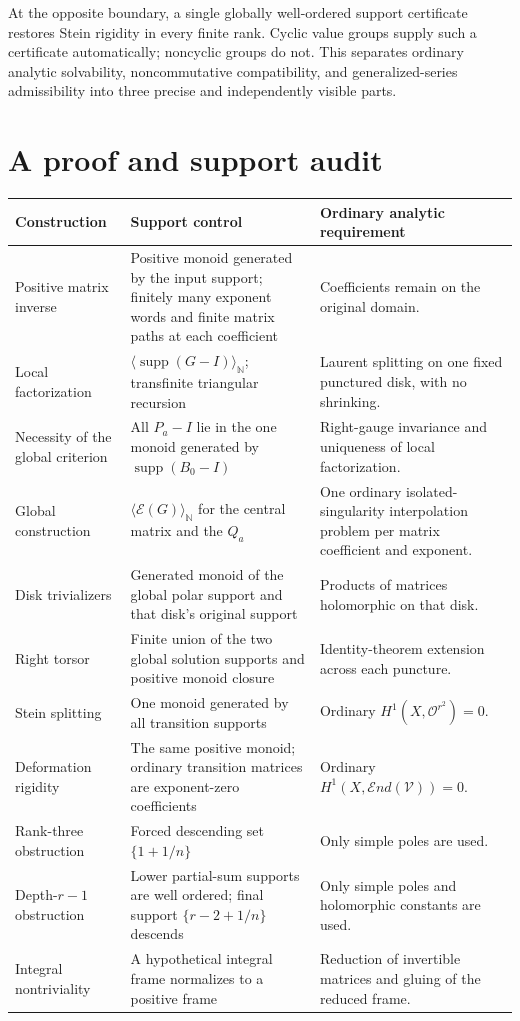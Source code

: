 \documentclass[11pt,letterpaper]{article}
\theoremstyle{definition}
\theoremstyle{remark}
\newcommand{\N}{\mathbb N}
\newcommand{\OO}{\mathcal O}
\newcommand{\supp}{\operatorname{supp}}
\newcommand{\End}{\mathcal E nd}
\newcommand{\EU}{\mathcal E}
\newcommand{\angles}[1]{\langle #1\rangle_{\N}}
\numberwithin{equation}{section}
\begin{document}
At the opposite boundary, a single globally well-ordered support certificate restores Stein rigidity in every finite rank. Cyclic value groups supply such a certificate automatically; noncyclic groups do not. This separates ordinary analytic solvability, noncommutative compatibility, and generalized-series admissibility into three precise and independently visible parts.

\appendix

\section{A proof and support audit}\label{app:audit}

\begin{longtable}{@{}L{0.25\textwidth}L{0.35\textwidth}L{0.32\textwidth}@{}}
\toprule
Construction & Support control & Ordinary analytic requirement\\
\midrule
\endhead
Positive matrix inverse & Positive monoid generated by the input support; finitely many exponent words and finite matrix paths at each coefficient & Coefficients remain on the original domain.\\[0.4em]
Local factorization & $\angles{\supp(G-I)}$; transfinite triangular recursion & Laurent splitting on one fixed punctured disk, with no shrinking.\\[0.4em]
Necessity of the global criterion & All $P_a-I$ lie in the one monoid generated by $\supp(B_0-I)$ & Right-gauge invariance and uniqueness of local factorization.\\[0.4em]
Global construction & $\angles{\EU(G)}$ for the central matrix and the $Q_a$ & One ordinary isolated-singularity interpolation problem per matrix coefficient and exponent.\\[0.4em]
Disk trivializers & Generated monoid of the global polar support and that disk's original support & Products of matrices holomorphic on that disk.\\[0.4em]
Right torsor & Finite union of the two global solution supports and positive monoid closure & Identity-theorem extension across each puncture.\\[0.4em]
Stein splitting & One monoid generated by all transition supports & Ordinary $H^1(X,\OO^{r^2})=0$.\\[0.4em]
Deformation rigidity & The same positive monoid; ordinary transition matrices are exponent-zero coefficients & Ordinary $H^1(X,\End(\mathcal V))=0$.\\[0.4em]
Rank-three obstruction & Forced descending set $\{1+1/n\}$ & Only simple poles are used.\\[0.4em]
Depth-$r-1$ obstruction & Lower partial-sum supports are well ordered; final support $\{r-2+1/n\}$ descends & Only simple poles and holomorphic constants are used.\\[0.4em]
Integral nontriviality & A hypothetical integral frame normalizes to a positive frame & Reduction of invertible matrices and gluing of the reduced frame.\\
\bottomrule
\end{longtable}
\end{document}
